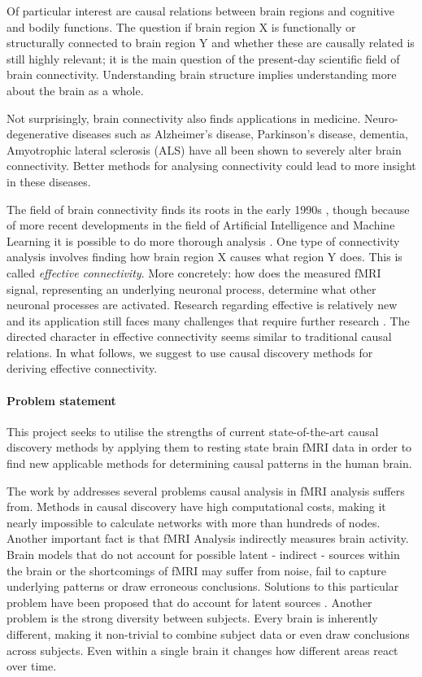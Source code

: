 \documentclass[a4paper, 10pt, english, twocolumn]{article}
\begin{document}
Of particular interest are causal relations between brain regions and cognitive and bodily functions.
The question if brain region X is functionally or structurally connected to brain region Y and whether these are causally related is still highly relevant; it is the main question of the present-day scientific field of brain connectivity.
Understanding brain structure implies understanding more about the brain as a whole.

Not surprisingly, brain connectivity also finds applications in medicine.
Neuro-degenerative diseases such as Alzheimer's disease, Parkinson's disease, dementia, Amyotrophic lateral sclerosis (ALS) have all been shown to severely alter brain connectivity. %
Better methods for analysing connectivity could lead to more insight in these diseases.

The field of brain connectivity finds its roots in the early 1990s \cite{friston1993functional, friston1994}, though because of more recent developments in the field of Artificial Intelligence and Machine Learning it is possible to do more thorough analysis \cite{vandenheuvel2010}.
One type of connectivity analysis involves finding how brain region X causes what region Y does. This is called \emph{effective connectivity}.
More concretely: how does the measured fMRI signal, representing an underlying neuronal process, determine what other neuronal processes are activated.
Research regarding effective is relatively new and its application still faces many challenges that require further research \cite{ramsey2010}.
The directed character in effective connectivity seems similar to traditional causal relations.
In what follows, we suggest to use causal discovery methods for deriving effective connectivity.

\paragraph{Problem statement}
This project seeks to utilise the strengths of current state-of-the-art causal discovery methods by applying them to resting state brain fMRI data in order to find new applicable methods for determining causal patterns in the human brain.

The work by \cite{ramsey2010} addresses several problems causal analysis in fMRI analysis suffers from.
Methods in causal discovery have high computational costs, making it nearly impossible to calculate networks with more than hundreds of nodes.
Another important fact is that fMRI Analysis indirectly measures brain activity.
Brain models that do not account for possible latent - indirect - sources within the brain or the shortcomings of fMRI may suffer from noise, fail to capture underlying patterns or draw erroneous conclusions.
Solutions to this particular problem have been proposed that do account for latent sources \cite{ramsey2010, waldorp2011}.
Another problem is the strong diversity between subjects.
Every brain is inherently different, making it non-trivial to combine subject data or even draw conclusions across subjects.
Even within a single brain it changes how different areas react over time.
\end{document}
